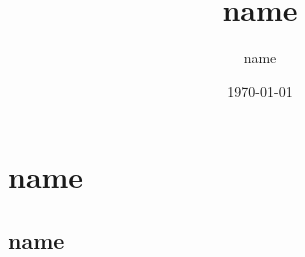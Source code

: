 \documentclass[10pt,a4paper]{article}
\begin{document}
\title{name}
\author{name}
\date{\autodate\today}
\maketitle
{}

\tableofcontents

\listoffigures

\newpage

\section{name}

\subsection{name}

\printbibliography
\end{document}
